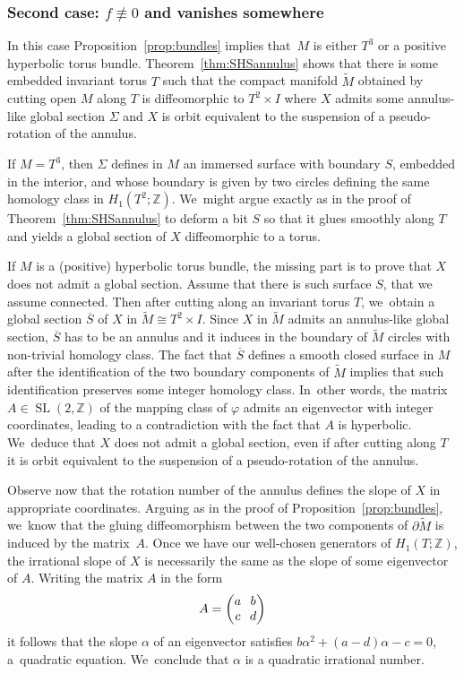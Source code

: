 \documentclass[10pt]{amsart}
\DeclareMathOperator{\SL}{SL}
\theoremstyle{definition}
\begin{document}
\subsubsection*{Second case: $f\not \equiv 0$ and vanishes somewhere}
In this case Proposition~\ref{prop:bundles} implies that~$M$ is either $T^3$ or a positive hyperbolic torus bundle. Theorem~\ref{thm:SHSannulus} shows that there is some embedded invariant torus $T$ such that the compact manifold $\widetilde M$ obtained by cutting open $M$ along $T$ is diffeomorphic to $T^2\times I$ where $X$ admits some annulus-like global section $\Sigma$ and $X$ is orbit equivalent to the suspension of a pseudo-rotation of the annulus.

If $M=T^3$, then $\Sigma$ defines in $M$ an immersed surface with boundary $S$, embedded in the interior, and whose boundary is given by two circles defining the same homology class in $H_1(T^2;\mathbb{Z})$. We~might argue exactly as in the proof of Theorem~\ref{thm:SHSannulus} to deform a bit $S$ so that it glues smoothly along $T$ and yields a global section of $X$ diffeomorphic to a torus.

If $M$ is a (positive) hyperbolic torus bundle, the missing part is to prove that $X$ does not admit a global section. Assume that there is such surface $S$, that we assume connected. Then after cutting along an invariant torus $T$, we~obtain a global section $\overline S$ of $X$ in $\widetilde M \cong T^2\times I$. Since $X$ in $\widetilde{M}$ admits an annulus-like global section, $\overline{S}$ has to be an annulus and it induces in the boundary of $\widetilde M$ circles with non-trivial homology class.
The fact that $\overline S$ defines a smooth closed surface in $M$ after the identification of the two boundary components of $\widetilde M$ implies that such identification preserves some integer homology class. In~other words, the matrix $A\in \SL(2,\mathbb{Z})$ of the mapping class of $\varphi$ admits an eigenvector with integer coordinates, leading to a contradiction with the fact that $A$ is hyperbolic. We~deduce that $X$ does not admit a global section, even if after cutting along $T$ it is orbit equivalent to the suspension of a pseudo-rotation of the annulus.

Observe now that the rotation number of the annulus defines the slope of $X$ in appropriate coordinates. Arguing as in the proof of Proposition~\ref{prop:bundles}, we~know that the gluing diffeomorphism between the two components of $\partial \widetilde M$ is induced by the matrix~$A$. Once we have our well-chosen generators of $H_1(T;\mathbb{Z})$, the irrational slope of $X$ is necessarily the same as the slope of some eigenvector of $A$. Writing the matrix $A$ in the form
\begin{equation*}\arraycolsep3.5pt
A=\begin{pmatrix}
a & b \\
c & d
\end{pmatrix}
\end{equation*}
it follows that the slope $\alpha$ of an eigenvector satisfies $b\alpha^2+(a-d)\alpha-c=0$, a~quadratic equation. We~conclude that $\alpha$ is a quadratic irrational number.
\end{document}
